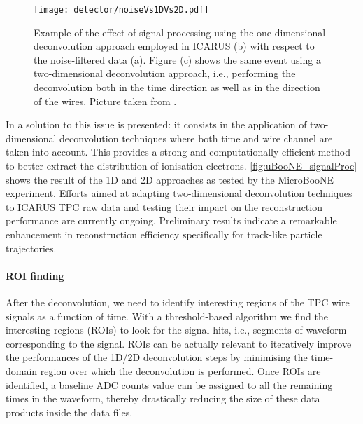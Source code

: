 \begin{figure}
    \centering
    \texttt{[image: detector/noiseVs1DVs2D.pdf]}
    \caption[TPC signal processing]{Example of the effect of signal processing using the one-dimensional deconvolution approach employed in ICARUS (b) with respect to the noise-filtered data (a). Figure (c) shows the same event using a two-dimensional deconvolution approach, i.e., performing the deconvolution both in the time direction as well as in the direction of the wires. Picture taken from \cite{MicroBooNE:2018swd}. }
    \label{fig:uBooNE_signalProc}
\end{figure}

In \cite{MicroBooNE:2018swd,MicroBooNE:2018vro} a solution to this issue is presented: it consists in the application of two-dimensional deconvolution techniques where both time and wire channel are taken into account. This provides a strong and computationally efficient method to better extract the distribution of ionisation electrons. \autoref{fig:uBooNE_signalProc} shows the result of the 1D and 2D approaches as tested by the MicroBooNE experiment. Efforts aimed at adapting two-dimensional deconvolution techniques to ICARUS TPC raw data and testing their impact on the reconstruction performance are currently ongoing. Preliminary results indicate a remarkable enhancement in reconstruction efficiency specifically for track-like particle trajectories.

\paragraph{ROI finding} After the deconvolution, we need to identify interesting regions of the TPC wire signals as a function of time. With a threshold-based algorithm we find the interesting regions (ROIs) to look for the signal hits, i.e., segments of waveform corresponding to the signal. ROIs can be actually relevant to iteratively improve the performances of the 1D/2D deconvolution steps by minimising the time-domain region over which the deconvolution is performed. Once ROIs are identified, a baseline ADC counts value can be assigned to all the remaining times in the waveform, thereby drastically reducing the size of these data products inside the data files. 

